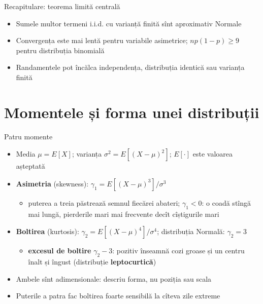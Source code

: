 \begin{frame}{Recapitulare: teorema limită centrală}
\itemsize{\small}
\begin{itemize}
    \item Sumele multor termeni i.i.d. cu varianță finită sînt aproximativ Normale
    \item Convergența este mai lentă pentru variabile asimetrice; $np(1-p) \ge 9$ pentru distribuția binomială
    \item Randamentele pot încălca independența, distribuția identică sau varianța finită
\end{itemize}
\end{frame}


\section{Momentele și forma unei distribuții}

\begin{frame}{Patru momente}
\itemsize{\small}
\begin{itemize}
    \item Media $\mu = E[X]$; varianța $\sigma^2 = E[(X - \mu)^2]$; $E[\cdot]$ este valoarea așteptată
    \item \textbf{Asimetria} (skewness): $\gamma_1 = E[(X - \mu)^3]/\sigma^3$
    \begin{itemize}
        \item puterea a treia păstrează semnul fiecărei abateri; $\gamma_1 < 0$: o coadă stîngă mai lungă, pierderile mari mai frecvente decît cîștigurile mari
    \end{itemize}
    \item \textbf{Boltirea} (kurtosis): $\gamma_2 = E[(X - \mu)^4]/\sigma^4$; distribuția Normală: $\gamma_2 = 3$
    \begin{itemize}
        \item \textbf{excesul de boltire} $\gamma_2 - 3$: pozitiv înseamnă cozi groase și un centru înalt și îngust (distribuție \textbf{leptocurtică})
    \end{itemize}
    \item Ambele sînt adimensionale: descriu forma, nu poziția sau scala
    \item Puterile a patra fac boltirea foarte sensibilă la cîteva zile extreme
\end{itemize}
\end{frame}

